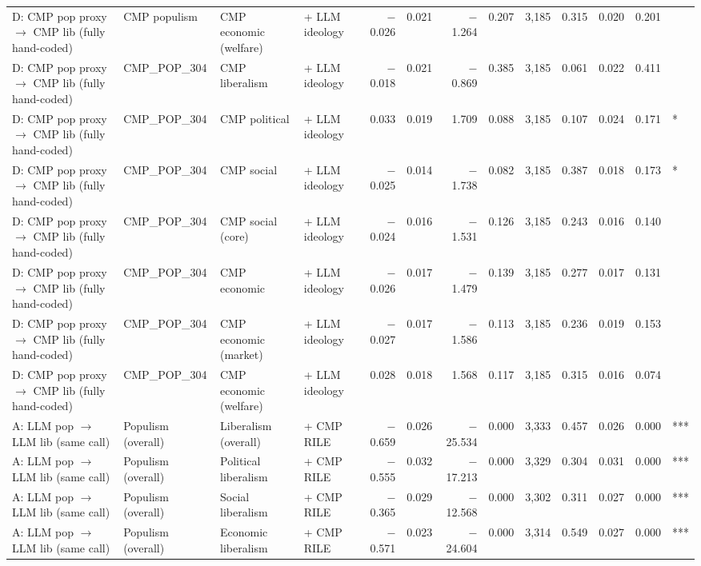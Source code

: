 \begin{table}[ht]
{\begin{tabular}{llllrrrrrrrrl}
D: CMP pop proxy $\rightarrow$ CMP lib (fully hand-coded) & CMP populism & CMP economic (welfare) & + LLM ideology & $-$0.026 & 0.021 & $-$1.264 & 0.207 & 3,185 & 0.315 & 0.020 & 0.201 &  \\
D: CMP pop proxy $\rightarrow$ CMP lib (fully hand-coded) & CMP\_POP\_304 & CMP liberalism & + LLM ideology & $-$0.018 & 0.021 & $-$0.869 & 0.385 & 3,185 & 0.061 & 0.022 & 0.411 &  \\
D: CMP pop proxy $\rightarrow$ CMP lib (fully hand-coded) & CMP\_POP\_304 & CMP political & + LLM ideology & 0.033 & 0.019 & 1.709 & 0.088 & 3,185 & 0.107 & 0.024 & 0.171 & * \\
D: CMP pop proxy $\rightarrow$ CMP lib (fully hand-coded) & CMP\_POP\_304 & CMP social & + LLM ideology & $-$0.025 & 0.014 & $-$1.738 & 0.082 & 3,185 & 0.387 & 0.018 & 0.173 & * \\
D: CMP pop proxy $\rightarrow$ CMP lib (fully hand-coded) & CMP\_POP\_304 & CMP social (core) & + LLM ideology & $-$0.024 & 0.016 & $-$1.531 & 0.126 & 3,185 & 0.243 & 0.016 & 0.140 &  \\
D: CMP pop proxy $\rightarrow$ CMP lib (fully hand-coded) & CMP\_POP\_304 & CMP economic & + LLM ideology & $-$0.026 & 0.017 & $-$1.479 & 0.139 & 3,185 & 0.277 & 0.017 & 0.131 &  \\
D: CMP pop proxy $\rightarrow$ CMP lib (fully hand-coded) & CMP\_POP\_304 & CMP economic (market) & + LLM ideology & $-$0.027 & 0.017 & $-$1.586 & 0.113 & 3,185 & 0.236 & 0.019 & 0.153 &  \\
D: CMP pop proxy $\rightarrow$ CMP lib (fully hand-coded) & CMP\_POP\_304 & CMP economic (welfare) & + LLM ideology & 0.028 & 0.018 & 1.568 & 0.117 & 3,185 & 0.315 & 0.016 & 0.074 &  \\
A: LLM pop $\rightarrow$ LLM lib (same call) & Populism (overall) & Liberalism (overall) & + CMP RILE & $-$0.659 & 0.026 & $-$25.534 & 0.000 & 3,333 & 0.457 & 0.026 & 0.000 & *** \\
A: LLM pop $\rightarrow$ LLM lib (same call) & Populism (overall) & Political liberalism & + CMP RILE & $-$0.555 & 0.032 & $-$17.213 & 0.000 & 3,329 & 0.304 & 0.031 & 0.000 & *** \\
A: LLM pop $\rightarrow$ LLM lib (same call) & Populism (overall) & Social liberalism & + CMP RILE & $-$0.365 & 0.029 & $-$12.568 & 0.000 & 3,302 & 0.311 & 0.027 & 0.000 & *** \\
A: LLM pop $\rightarrow$ LLM lib (same call) & Populism (overall) & Economic liberalism & + CMP RILE & $-$0.571 & 0.023 & $-$24.604 & 0.000 & 3,314 & 0.549 & 0.027 & 0.000 & *** \\

\end{tabular}}
\end{table}

